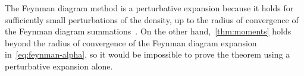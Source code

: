 The Feynman diagram method is a {perturbative expansion}
because it holds for sufficiently small perturbations of the \goe density,
up to the radius of convergence of the Feynman diagram summations~\cite{mcLaughlin,garouf}.
On the other hand,~\cref{thm:moments} holds beyond the radius of convergence of the Feynman diagram expansion in~\cref{eq:feynman-alpha},
so it would be impossible to prove the theorem using a perturbative expansion alone.